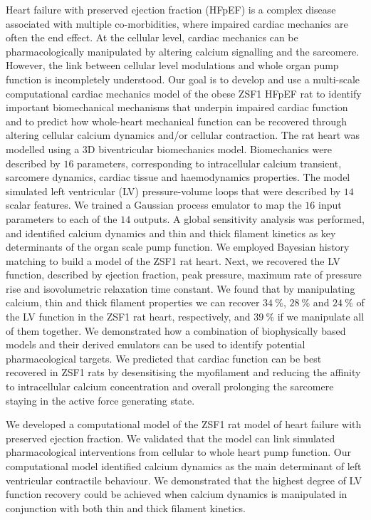\noindent
Heart failure with preserved ejection fraction (HFpEF) is a complex disease associated with multiple co-morbidities, where impaired cardiac mechanics are often the end effect. At the cellular level, cardiac mechanics can be pharmacologically manipulated by altering calcium signalling and the sarcomere. However, the link between cellular level modulations and whole organ pump function is incompletely understood. Our goal is to develop and use a multi-scale computational cardiac mechanics model of the obese ZSF1 HFpEF rat to identify important biomechanical mechanisms that underpin impaired cardiac function and to predict how whole-heart mechanical function can be recovered through altering cellular calcium dynamics and/or cellular contraction. The rat heart was modelled using a $3$D biventricular biomechanics model. Biomechanics were described by $16$ parameters, corresponding to intracellular calcium transient, sarcomere dynamics, cardiac tissue and haemodynamics properties. The model simulated left ventricular (LV) pressure-volume loops that were described by $14$ scalar features. We trained a Gaussian process emulator to map the $16$ input parameters to each of the $14$ outputs. A global sensitivity analysis was performed, and identified calcium dynamics and thin and thick filament kinetics as key determinants of the organ scale pump function. We employed Bayesian history matching to build a model of the ZSF1 rat heart. Next, we recovered the LV function, described by ejection fraction, peak pressure, maximum rate of pressure rise and isovolumetric relaxation time constant. We found that by manipulating calcium, thin and thick filament properties we can recover $\SI{34}{\percent}$, $\SI{28}{\percent}$ and $\SI{24}{\percent}$ of the LV function in the ZSF1 rat heart, respectively, and $\SI{39}{\percent}$ if we manipulate all of them together. We demonstrated how a combination of biophysically based models and their derived emulators can be used to identify potential pharmacological targets. We predicted that cardiac function can be best recovered in ZSF1 rats by desensitising the myofilament and reducing the affinity to intracellular calcium concentration and overall prolonging the sarcomere staying in the active force generating state.

\vspace{0.2cm}\noindent
{}

\noindent
We developed a computational model of the ZSF1 rat model of heart failure with preserved ejection fraction. We validated that the model can link simulated pharmacological interventions from cellular to whole heart pump function. Our computational model identified calcium dynamics as the main determinant of left ventricular contractile behaviour. We demonstrated that the highest degree of LV function recovery could be achieved when calcium dynamics is manipulated in conjunction with both thin and thick filament kinetics.

